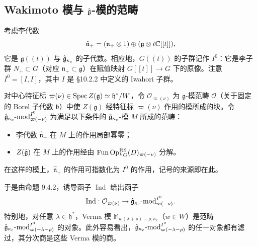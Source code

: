 \subsection{Wakimoto 模与 $\hat{\mathfrak{g}}$-模的范畴}

考虑李代数
\[
    \hat{\mathfrak{n}}_+ = (\mathfrak{n}_+\otimes1)\oplus(\mathfrak{g}\otimes t\mathbb{C}[[t]]),
\]
它是 $\mathfrak{g}((t))$ 与 $\hat{\mathfrak{g}}_{\kappa_c}$ 的子代数。相应地，$G((t))$ 的子群记作 $I^0$：它是李子群 $N_+\subset G$（对应 $\mathfrak{n}_+\subset\mathfrak{g}$）在赋值映射 $G[[t]]\to G$ 下的原像。注意 $I^0=[I,I]$，其中 $I$ 是 §10.2.2 中定义的 Iwahori 子群。

对中心特征标 $\varpi(\nu)\in\operatorname{Spec} Z(\mathfrak{g})\simeq\mathfrak{h}^*/W$，令 $\mathcal{O}_{\varpi(\nu)}$ 为 $\mathfrak{g}$-模范畴 $\mathcal{O}$（关于固定的 Borel 子代数 $\mathfrak{b}$）中使 $Z(\mathfrak{g})$ 经特征标 $\varpi(\nu)$ 作用的模所成的块。令 $\hat{\mathfrak{g}}_{\kappa_c}\text{-mod}^{I^0}_{\varpi(-\nu)}$ 为满足以下条件的 $\hat{\mathfrak{g}}_{\kappa_c}$-模 $M$ 所成的范畴：
\begin{itemize}
    \item 李代数 $\hat{\mathfrak{n}}_+$ 在 $M$ 上的作用局部幂零；
    \item $Z(\hat{\mathfrak{g}})$ 在 $M$ 上的作用经由 $\operatorname{Fun}\operatorname{Op}^{\mathrm{RS}}_{{}^LG}(D)_{\varpi(-\nu)}$ 分解。
\end{itemize}
在这样的模上，$\hat{\mathfrak{n}}_+$ 的作用可指数化为 $I^0$ 的作用，记号的来源即在此。

于是由命题 9.4.2，诱导函子 $\operatorname{Ind}$ 给出函子
\[
    \operatorname{Ind}:\mathcal{O}_{\varpi(\nu)}\to\hat{\mathfrak{g}}_{\kappa_c}\text{-mod}^{I^0}_{\varpi(-\nu)}.
\]
特别地，对任意 $\lambda\in\mathfrak{h}^*$，Verma 模 $\mathbb{M}_{w(\lambda+\rho)-\rho,\kappa_c}$（$w\in W$）是范畴 $\hat{\mathfrak{g}}_{\kappa_c}\text{-mod}^{I^0}_{\varpi(-\lambda-\rho)}$ 的对象。此外容易看出，$\hat{\mathfrak{g}}_{\kappa_c}\text{-mod}^{I^0}_{\varpi(-\lambda-\rho)}$ 的任一对象都有滤过，其分次商是这些 Verma 模的商。


